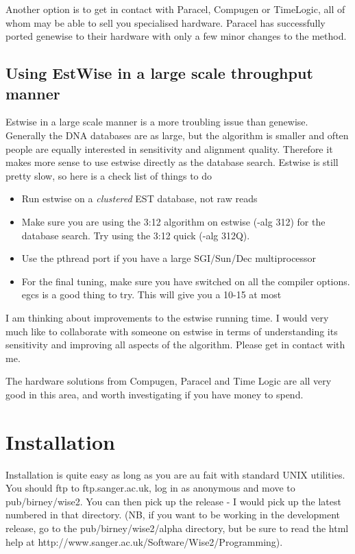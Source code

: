 \documentclass{article}
\begin{document}
Another option is to get in contact with Paracel, Compugen or
TimeLogic, all of whom may be able to sell you specialised
hardware. Paracel has successfully ported genewise to their hardware
with only a few minor changes to the method. 

\subsection{Using EstWise in a large scale throughput manner}
\label{estwise_large}

Estwise in a large scale manner is a more troubling issue than genewise.
Generally the DNA databases are as large, but the algorithm is smaller
and often people are equally interested in sensitivity and alignment
quality. Therefore it makes more sense to use estwise directly as the
database search. Estwise is still pretty slow, so here is a check list
of things to do

\begin{itemize}
\item Run estwise on a \emph{clustered} EST database, not raw reads
\item Make sure you are using the 3:12 algorithm on estwise (-alg 312)
for the database search. Try using the 3:12 quick (-alg 312Q).
\item Use the pthread port if you have a large SGI/Sun/Dec multiprocessor
\item For the final tuning, make sure you have switched on all the compiler
options. egcs is a good thing to try. This will give you a 10-15%
at most
\end{itemize}

I am thinking about improvements to the estwise running time. I would very
much like to collaborate with someone on estwise in terms of understanding
its sensitivity and improving all aspects of the algorithm. Please get in
contact with me.

The hardware solutions from Compugen, Paracel and Time Logic are all very
good in this area, and worth investigating if you have money to spend.


\newpage
\section{Installation}
 
Installation is quite easy as long as you are au fait with 
standard UNIX utilities. You should ftp to ftp.sanger.ac.uk,
log in as anonymous and move to pub/birney/wise2. You can
then pick up the release - I would pick up the latest
numbered in that directory. (NB, if you want to be working
in the development release, go to the pub/birney/wise2/alpha
directory, but be sure to read the html help at 
http://www.sanger.ac.uk/Software/Wise2/Programming).
\end{document}
